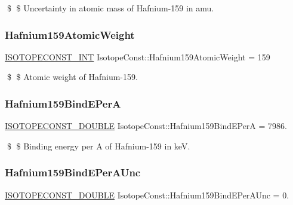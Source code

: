 \$ \$ Uncertainty in atomic mass of Hafnium-\/159 in amu. \mbox{\label{group___isotope_const-_hafnium-_hf159_gaa50fd8afd82bc24ee40ead354ed8e7fc}} 
\subsubsection{\texorpdfstring{Hafnium159\+Atomic\+Weight}{Hafnium159AtomicWeight}}
{\footnotesize\ttfamily \mbox{\hyperlink{group___isotope_const-_macros_ga5f18360b3e99483a35c32d789e62621c}{I\+S\+O\+T\+O\+P\+E\+C\+O\+N\+S\+T\+\_\+\+I\+NT}} Isotope\+Const\+::\+Hafnium159\+Atomic\+Weight = 159}

\$ \$ Atomic weight of Hafnium-\/159. \mbox{\label{group___isotope_const-_hafnium-_hf159_ga7e8451f2ffe299a99958e2673b7ca943}} 
\subsubsection{\texorpdfstring{Hafnium159\+Bind\+E\+PerA}{Hafnium159BindEPerA}}
{\footnotesize\ttfamily \mbox{\hyperlink{group___isotope_const-_macros_ga8f45a7272ce02c0b4c65c44636ed719a}{I\+S\+O\+T\+O\+P\+E\+C\+O\+N\+S\+T\+\_\+\+D\+O\+U\+B\+LE}} Isotope\+Const\+::\+Hafnium159\+Bind\+E\+PerA = 7986.}

\$ \$ Binding energy per A of Hafnium-\/159 in keV. \mbox{\label{group___isotope_const-_hafnium-_hf159_ga1263dff4787e1e9b218e6e75a96c1330}} 
\subsubsection{\texorpdfstring{Hafnium159\+Bind\+E\+Per\+A\+Unc}{Hafnium159BindEPerAUnc}}
{\footnotesize\ttfamily \mbox{\hyperlink{group___isotope_const-_macros_ga8f45a7272ce02c0b4c65c44636ed719a}{I\+S\+O\+T\+O\+P\+E\+C\+O\+N\+S\+T\+\_\+\+D\+O\+U\+B\+LE}} Isotope\+Const\+::\+Hafnium159\+Bind\+E\+Per\+A\+Unc = 0.}

